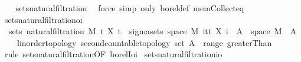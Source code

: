 \begin{isabellebody}
%
\isadelimproof
\ \ %
\endisadelimproof
%
\isatagproof
{}\isamarkupfalse%
\ sets{\isacharunderscore}{\kern0pt}natural{\isacharunderscore}{\kern0pt}filtration{\isacharprime}{\kern0pt}\ \isamarkupfalse%
\ {\isacharparenleft}{\kern0pt}force\ simp\ only{\isacharcolon}{\kern0pt}\ borel{\isacharunderscore}{\kern0pt}def\ mem{\isacharunderscore}{\kern0pt}Collect{\isacharunderscore}{\kern0pt}eq{\isacharparenright}{\kern0pt}%
\endisatagproof
{\isafoldproof}%
%
\isadelimproof
\isanewline
%
\endisadelimproof
\isanewline
{}\isamarkupfalse%
\ sets{\isacharunderscore}{\kern0pt}natural{\isacharunderscore}{\kern0pt}filtration{\isacharunderscore}{\kern0pt}oi{\isacharcolon}{\kern0pt}\ \isanewline
\ \ {\isachardoublequoteopen}sets\ {\isacharparenleft}{\kern0pt}natural{\isacharunderscore}{\kern0pt}filtration\ M\ t\ X\ t{\isacharparenright}{\kern0pt}\ {\isacharequal}{\kern0pt}\ sigma{\isacharunderscore}{\kern0pt}sets\ {\isacharparenleft}{\kern0pt}space\ M{\isacharparenright}{\kern0pt}\ {\isacharparenleft}{\kern0pt}{\isasymUnion}i{\isasymin}{\isacharbraceleft}{\kern0pt}tt{\isacharbraceright}{\kern0pt}{\isachardot}{\kern0pt}\ {\isacharbraceleft}{\kern0pt}X\ i\ {\isacharminus}{\kern0pt}{\isacharbackquote}{\kern0pt}\ A\ {\isasyminter}\ space\ M\ {\isacharbar}{\kern0pt}\ A\ {\isacharcolon}{\kern0pt}{\isacharcolon}{\kern0pt}\ {\isacharunderscore}{\kern0pt}\ {\isacharcolon}{\kern0pt}{\isacharcolon}{\kern0pt}\ {\isacharbraceleft}{\kern0pt}linorder{\isacharunderscore}{\kern0pt}topology{\isacharcomma}{\kern0pt}\ second{\isacharunderscore}{\kern0pt}countable{\isacharunderscore}{\kern0pt}topology{\isacharbraceright}{\kern0pt}\ set{\isachardot}{\kern0pt}\ A\ {\isasymin}\ range\ greaterThan{\isacharbraceright}{\kern0pt}{\isacharparenright}{\kern0pt}{\isachardoublequoteclose}\ \isanewline
%
\isadelimproof
\ \ %
\endisadelimproof
%
\isatagproof
{}\isamarkupfalse%
\ {\isacharparenleft}{\kern0pt}rule\ sets{\isacharunderscore}{\kern0pt}natural{\isacharunderscore}{\kern0pt}filtration{\isacharprime}{\kern0pt}{\isacharbrackleft}{\kern0pt}OF\ borel{\isacharunderscore}{\kern0pt}Ioi{\isacharbrackright}{\kern0pt}{\isacharparenright}{\kern0pt}%
\endisatagproof
{\isafoldproof}%
%
\isadelimproof
\isanewline
%
\endisadelimproof
\isanewline
{}\isamarkupfalse%
\ sets{\isacharunderscore}{\kern0pt}natural{\isacharunderscore}{\kern0pt}filtration{\isacharunderscore}{\kern0pt}io{\isacharcolon}{\kern0pt}\isanewline

\end{isabellebody}
